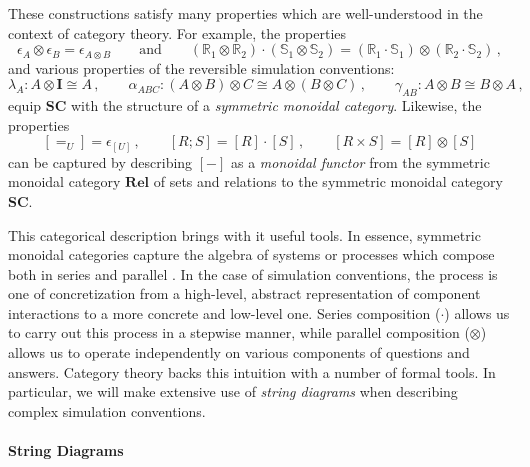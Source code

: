 \documentclass[acmsmall,screen,review,anonymous]{acmart}
\begin{document}
These constructions satisfy many properties
which are well-understood in the context of category theory.
For example, the properties
\[
  \epsilon_A \otimes \epsilon_B = \epsilon_{A \otimes B}
  \qquad \text{and}
  \qquad
  (\mathbb{R}_1 \otimes \mathbb{R}_2) \cdot
  (\mathbb{S}_1 \otimes \mathbb{S}_2) =
  (\mathbb{R}_1 \cdot \mathbb{S}_1) \otimes
  (\mathbb{R}_2 \cdot \mathbb{S}_2)
  \,,
\]
and various properties of the reversible simulation conventions:
\[
  \lambda_A : A \otimes \mathbf{I} \cong A \,,
  \qquad
  \alpha_{ABC} : (A \otimes B) \otimes C \cong A \otimes (B \otimes C) \,,
  \qquad
  \gamma_{AB} : A \otimes B \cong B \otimes A \,,
\]
equip %
$\mathbf{SC}$
with the structure of a \emph{symmetric monoidal category}.
Likewise, the properties
\[
  [{=}_U] = \epsilon_{[U]} \,,
  \qquad
  [R \mathbin; S] = [R] \cdot [S] \,,
  \qquad
  [R \times S] = [R] \otimes [S]
\]
can be captured by describing
$[-]$ as a \emph{monoidal functor}
from the symmetric monoidal category $\mathbf{Rel}$
of sets and relations
to the symmetric monoidal category $\mathbf{SC}$.

This categorical description %
brings with it useful tools.
In essence,
symmetric monoidal categories capture
the algebra of systems or processes which
compose both in series and parallel
\cite{rosetta}.
In the case of simulation conventions,
the process is one of concretization
from a high-level, abstract representation
of component interactions
to a more concrete and low-level one.
Series composition ($\cdot$)
allows us to carry out this process in a stepwise manner,
while parallel composition ($\otimes$)
allows us to operate independently on various components
of questions and answers.
Category theory backs this intuition
with a number of formal tools.
In particular,
we will make extensive use of \emph{string diagrams}
when describing complex simulation conventions.


\paragraph{String Diagrams} %
\end{document}
